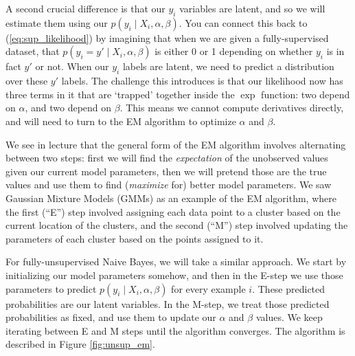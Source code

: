 \documentclass[12pt]{article}
\begin{document}
A second crucial difference is that our $y_i$ variables are latent, and so we
will estimate them using our $p(y_i \mid X_i, \alpha, \beta)$. You can
connect this back to (\ref{eq:sup_likelihood}) by imagining that when we are
given a fully-supervised dataset, that $p(y_i = y' \mid X_i, \alpha, \beta)$
is either 0 or 1 depending on whether $y_i$ is in fact $y'$ or not. When
our $y_i$ labels are latent, we need to predict a distribution over these $y'$
labels. The challenge this introduces is that our likelihood now has three terms
in it that are `trapped' together inside the $\exp$ function: two depend on $\alpha$,
and two depend on $\beta$. This means we cannot compute derivatives directly,
and will need to turn to the EM algorithm to optimize $\alpha$ and $\beta$.

We see in lecture that the general form of the EM algorithm involves
alternating between two steps: first we will find the {\it expectation} of the
unobserved values given our current model parameters, then we will pretend
those are the true values and use them to find ({\it maximize} for) better
model parameters.
We saw Gaussian Mixture Models (GMMs) as an example of the EM algorithm, where
the first (``E'') step involved assigning each data point to a cluster based on
the current location of the clusters, and the second (``M'') step involved
updating the parameters of each cluster based on the points assigned to it.

For fully-unsupervised Naive Bayes, we will take a similar approach. We start by
initializing our model parameters somehow, and then in the E-step we use those
parameters to predict $p(y_i \mid X_i, \alpha, \beta)$ for every example $i$.
These predicted probabilities are our latent variables.
In the M-step, we treat those predicted probabilities as fixed, and use them
to update our $\alpha$ and $\beta$ values. We keep iterating between E and M
steps until the algorithm converges. The algorithm is described in Figure
\ref{fig:unsup_em}.
\end{document}
